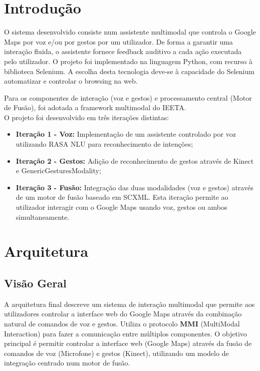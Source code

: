 \documentclass{report}
\begin{document}
\chapter{Introdução}
\label{chap.introducao}

O sistema desenvolvido consiste num assistente multimodal que controla o Google Maps por voz e/ou por gestos por um utilizador. De forma a garantir uma interação fluida, o assistente fornece feedback auditivo a cada ação executada pelo utilizador. O projeto foi implementado na linguagem Python, com recurso à biblioteca Selenium. A escolha desta tecnologia deve-se à capacidade do Selenium automatizar e controlar o browsing na web.

Para os componentes de interação (voz e gestos) e processamento central (Motor de Fusão), foi adotada a framework multimodal do IEETA. \\

O projeto foi desenvolvido em três iterações distintas:

\begin{itemize}
    \item \textbf{Iteração 1 - Voz:} Implementação de um assistente controlado por voz utilizando RASA NLU para reconhecimento de intenções;

    \item \textbf{Iteração 2 - Gestos:} Adição de reconhecimento de gestos através de Kinect e GenericGesturesModality;

    \item \textbf{Iteração 3 - Fusão:} Integração das duas modalidades (voz e gestos) através de um motor de fusão baseado em SCXML. Esta iteração permite ao utilizador interagir com o Google Maps usando voz, gestos ou ambos simultaneamente.
\end{itemize}


\chapter{Arquitetura}
\label{chap.arquitetura}

\section{Visão Geral}

A arquitetura final descreve um sistema de interação multimodal que permite aos utilizadores controlar a interface web do Google Maps através da combinação natural de comandos de voz e gestos. Utiliza  o protocolo \textbf{MMI} (MultiModal Interaction) para fazer a comunicação entre múltiplos componentes. O objetivo principal é permitir controlar a interface web (Google Maps) através da fusão de comandos de voz (Microfone) e gestos (Kinect), utilizando um modelo de integração centrado num motor de fusão.
\end{document}
